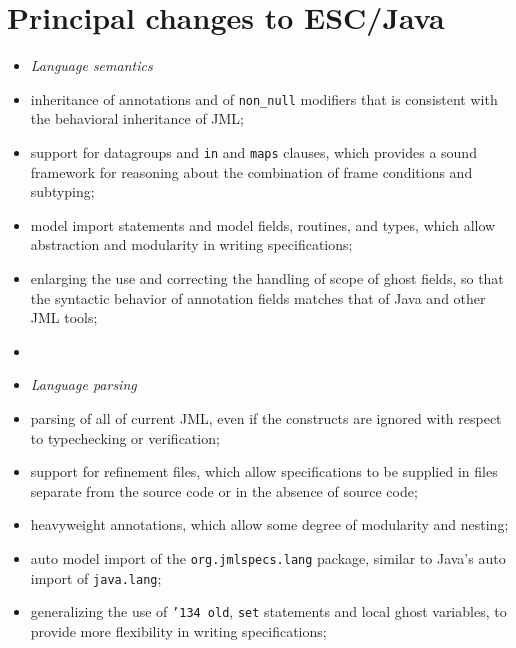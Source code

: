 \documentclass{llncs}
\begin{document}
%
%


\appendix

\section{Principal changes to ESC/Java}
\setlength{\partopsep}{0in}\setlength{\parskip}{0in}\setlength{\itemsep}{0in}\setlength{\topsep}{0in}
\begin{itemize}
\setlength{\partopsep}{0in}\setlength{\parskip}{0in}\setlength{\itemsep}{0in}\setlength{\topsep}{0in}
\item[] \textit{Language semantics}
\item inheritance of annotations and of \texttt{non\_null} modifiers
  that is consistent with the behavioral inheritance of JML;
\item support for datagroups and \texttt{in} and \texttt{maps}
  clauses, which provides a sound framework for reasoning about the
  combination of frame conditions and subtyping;
\item model import statements and model fields, routines, and types,
  which allow abstraction and modularity in writing specifications;
\item enlarging the use and correcting the handling of scope of ghost
  fields, so that the syntactic behavior of annotation fields matches
  that of Java and other JML tools;
\item[]
\item[] \textit{Language parsing}
\item parsing of all of current JML, even if the constructs are
  ignored with respect to typechecking or verification;
\item support for refinement files, which allow specifications to be
  supplied in files separate from the source code or in the absence of
  source code;
\item heavyweight annotations, which allow some degree of modularity
  and nesting;
\item auto model import of the \texttt{org.jmlspecs.lang} package,
  similar to Java's auto import of \texttt{java.lang};
\item generalizing the use of \texttt{\char'134 old}, \texttt{set}
  statements and local ghost variables, to provide more flexibility in
  writing specifications;

\end{itemize}
\end{document}
